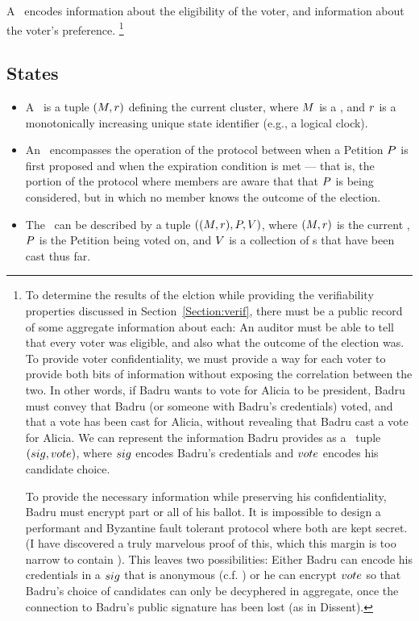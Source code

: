   A \StructBallot~encodes information about the eligibility of the voter,
    and information about the voter's preference.
    \footnote{To determine the results of
    the elction while providing the verifiability properties discussed in
    Section~\ref{Section:verif}, there must be a public record of some
    aggregate information about each: An auditor must be able to tell that every
    voter was eligible, and also what the outcome of the election was. To
    provide voter confidentiality, we must provide a way for each voter to
    provide both bits of information without exposing the correlation between
    the two. In other words, if Badru wants to vote for Alicia to be president,
    Badru must convey that Badru (or someone with Badru's credentials) voted,
    and that a vote has been cast for Alicia, without revealing that Badru cast
    a vote for Alicia. We can represent the information Badru provides as a
    \StructBallot~tuple $(sig, vote)$, where $sig$ encodes Badru's
    credentials and $vote$ encodes his candidate choice.

    To provide the necessary information while preserving his
    confidentiality, Badru must encrypt part or all of his ballot. It is
    impossible to design a performant and Byzantine fault tolerant protocol
    where both are kept secret. (I have discovered a truly marvelous proof of
    this, which this margin is too narrow to contain \tocite). This leaves two
    possibilities: Either Badru can encode his credentials in a $sig$ that is
    anonymous (c.f. \cite{lrs}) or he can encrypt $vote$ so that Badru's choice
    of candidates can only be decyphered in aggregate, once the connection to
    Badru's public signature has been lost (as in Dissent).
  }


\subsection{States}
\begin{itemize}
  \item A \StructState~is a tuple $(M, r)$ defining the current
    cluster, where $M$ is a \KwManifest, and $r$ is a
    monotonically increasing unique state identifier (e.g., a logical
    clock)\tocite.

  \item An \StructElection~encompasses the operation of the protocol between
    when a Petition $P$ is first proposed and when the expiration
    condition is met --- that is, the portion of the protocol where members are
    aware that that $P$ is being considered, but in which no member
    knows the outcome of the election.

  \item The \StructElectionState~can be described by a tuple $((M, r),
    P, V)$, where $(M, r)$ is the current \StructState,
    $P$ is the Petition being voted on, and $V$ is a
    collection of \StructBallot s that have been cast thus far.

\end{itemize}

